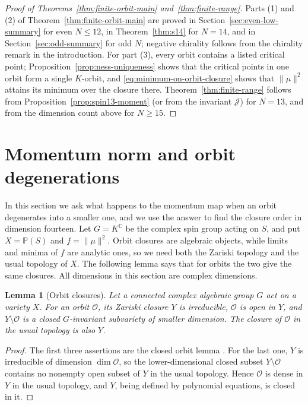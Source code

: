 \documentclass{article}
\newtheorem{lemma}[theorem]{Lemma}
\theoremstyle{definition}
\theoremstyle{remark}
\newcommand{\C}{\mathbb C}
\newcommand{\PP}{\mathbb P}
\newcommand{\norm}[1]{\lVert #1\rVert}
\begin{document}
\begin{proof}[Proof of Theorems~\ref{thm:finite-orbit-main}
and~\ref{thm:finite-range}]
Parts (1) and (2) of Theorem~\ref{thm:finite-orbit-main} are proved in
Section~\ref{sec:even-low-summary} for even $N\le12$, in
Theorem~\ref{thm:s14} for $N=14$, and in Section~\ref{sec:odd-summary} for odd
$N$; negative chirality follows from the chirality remark in the
introduction. For part (3), every orbit contains a listed critical point;
Proposition~\ref{prop:ness-uniqueness} shows that the critical points in one
orbit form a single $K$-orbit, and \eqref{eq:minimum-on-orbit-closure} shows
that $\norm\mu^2$ attains its minimum over the closure there. 
Theorem~\ref{thm:finite-range} follows from
Proposition~\ref{prop:spin13-moment} (or from the invariant $\mathcal J$) for
$N=13$, and from the dimension count above for $N\ge15$.
\end{proof}



\section{Momentum norm and orbit degenerations}
\label{sec:momentum-orbit-geometry}

In this section we ask what happens to the momentum map when an orbit
degenerates into a smaller one, and we use the answer to find the closure
order in dimension fourteen. Let $G=K^\C$ be the complex spin group acting on
$S$, and put $X=\PP(S)$ and $f=\norm\mu^2$. Orbit closures are algebraic
objects, while limits and minima of $f$ are analytic ones, so we need both
the Zariski topology and the usual topology of $X$. The following lemma says
that for orbits the two give the same closures. All dimensions in this section
are complex dimensions.

\begin{lemma}[Orbit closures]
\label{lem:orbit-closures}
Let a connected complex algebraic group $G$ act on a variety $X$.
For an orbit $\mathcal O$, its Zariski closure $Y$ is irreducible,
$\mathcal O$ is open in $Y$, and $Y\setminus\mathcal O$ is a closed
$G$-invariant subvariety of smaller dimension. The closure of
$\mathcal O$ in the usual topology is also $Y$.
\end{lemma}

\begin{proof}
The first three assertions are the closed orbit lemma
\cite{Borel1991}. For the last one, $Y$ is irreducible of
dimension $\dim\mathcal O$, so the lower-dimensional closed subset
$Y\setminus\mathcal O$ contains no nonempty open subset of $Y$ in the usual
topology. Hence $\mathcal O$ is dense in $Y$ in the usual topology, and $Y$,
being defined by polynomial equations, is closed in it.
\end{proof}
\end{document}
